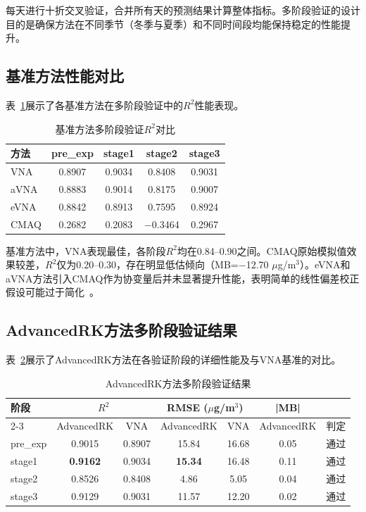 \documentclass[UTF8, a4paper, 12pt]{article}
\begin{document}
每天进行十折交叉验证，合并所有天的预测结果计算整体指标。多阶段验证的设计目的是确保方法在不同季节（冬季与夏季）和不同时间段均能保持稳定的性能提升。

\subsection{基准方法性能对比}

表~\ref{tab:benchmark}展示了各基准方法在多阶段验证中的$R^2$性能表现。

\begin{table}[H]
\centering
\caption{基准方法多阶段验证$R^2$对比}
\label{tab:benchmark}
\begin{tabular}{@{}lcccc@{}}
\toprule
方法 & pre\_exp & stage1 & stage2 & stage3 \\
\midrule
VNA & 0.8907 & 0.9034 & 0.8408 & 0.9031 \\
aVNA & 0.8883 & 0.9014 & 0.8175 & 0.9007 \\
eVNA & 0.8842 & 0.8913 & 0.7595 & 0.8924 \\
CMAQ & 0.2682 & 0.2083 & $-$0.3464 & 0.2967 \\
\bottomrule
\end{tabular}
\end{table}

基准方法中，VNA表现最佳，各阶段$R^2$均在0.84--0.90之间。CMAQ原始模拟值效果较差，$R^2$仅为0.20--0.30，存在明显低估倾向（MB=$-$12.70 $\mu$g/m$^3$）。eVNA和aVNA方法引入CMAQ作为协变量后并未显著提升性能，表明简单的线性偏差校正假设可能过于简化~\cite{liu2019spatial}。

\subsection{AdvancedRK方法多阶段验证结果}

表~\ref{tab:innovation}展示了AdvancedRK方法在各验证阶段的详细性能及与VNA基准的对比。

\begin{table}[H]
\centering
\caption{AdvancedRK方法多阶段验证结果}
\label{tab:innovation}
\begin{tabular}{@{}lcccccc@{}}
\toprule
阶段 & \multicolumn{2}{c}{$R^2$} & \multicolumn{2}{c}{RMSE ($\mu$g/m$^3$)} & |MB| & \\
\cmidrule{2-3} \cmidrule{4-5}
     & AdvancedRK & VNA & AdvancedRK & VNA & AdvancedRK & 判定 \\
\midrule
pre\_exp & 0.9015 & 0.8907 & 15.84 & 16.68 & 0.05 & 通过 \\
stage1   & \textbf{0.9162} & 0.9034 & \textbf{15.34} & 16.48 & 0.11 & 通过 \\
stage2   & 0.8526 & 0.8408 & 4.86 & 5.05 & 0.04 & 通过 \\
stage3   & 0.9129 & 0.9031 & 11.57 & 12.20 & 0.02 & 通过 \\
\bottomrule
\end{tabular}
\end{table}
\end{document}
